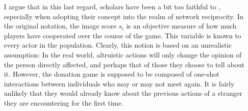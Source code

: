 \documentclass{JASSS}
\begin{document}
I argue that in this last regard, scholars have been a bit too faithful to \cite{Nowak1998}, especially when adopting their concept into the realm of network reciprocity. In the original notation, the image score $s_i$ is an objective measure of how much players have cooperated over the course of the game. This variable is known to every actor in the population. Clearly, this notion is based on an unrealistic assumption: In the real world, altruistic actions will only change the opinion of the person directly affected, and perhaps that of those they choose to tell about it. However, the donation game is supposed to be composed of one-shot interactions between individuals who may or may not meet again. It is fairly unlikely that they would already know about the previous actions of a stranger they are encountering for the first time.
\end{document}
